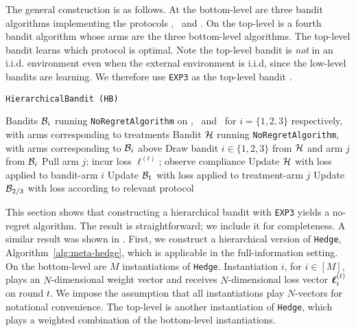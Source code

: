 The general construction is as follows. At the bottom-level are three bandit algorithms implementing the protocols \chosen, \actual\, and \comply. On the top-level is a fourth bandit algorithm whose arms are the three bottom-level algorithms. The top-level bandit learns which protocol is optimal. 
Note the top-level bandit is \emph{not} in an i.i.d. environment even when the external environment is i.i.d, since the low-level bandits are learning. We therefore use \texttt{EXP3} as the top-level bandit \cite{auer:02b}. 



\begin{algorithm}
   \caption{\texttt{HierarchicalBandit (HB)}}
   \label{alg:hier-exp}
   \begin{algorithmic}   
   	 Bandits ${\mathcal B}_i$ running \texttt{NoRegretAlgorithm} on \chosen, \actual\, and \comply\, for $i =\{1,2,3\}$ respectively, with arms corresponding to treatments
   	 Bandit ${\mathcal H}$ running \texttt{NoRegretAlgorithm}, with arms corresponding to ${\mathcal B}_i$ above
	\STATE Draw bandit $i\in\{1,2,3\}$ from ${\mathcal H}$ and arm $j$ from ${\mathcal B}_i$
	\STATE Pull arm $j$; incur loss $\ell^{(t)}$; observe compliance
	\STATE Update ${\mathcal H}$ with loss applied to bandit-arm $i$
	\STATE Update ${\mathcal B}_1$ with loss applied to treatment-arm $j$
	\ENDIF
	\STATE Update ${\mathcal B}_{2/3}$ with loss according to relevant protocol
   	\ENDFOR

       	\end{algorithmic}
\end{algorithm}          



This section shows that constructing a hierarchical bandit with \texttt{EXP3} yields a no-regret algorithm. The result is straightforward; we include it for completeness. A similar result was shown in \cite{chang:05}. 
First, we construct a hierarchical version of \texttt{Hedge}, Algorithm~\ref{alg:meta-hedge}, which is applicable in the full-information setting. On the bottom-level are $M$ instantiations of \texttt{Hedge}. Instantiation $i$, for $i\in[M]$, plays an $N$-dimensional weight vector and receives $N$-dimensional loss vector $\boldsymbol\ell^{(t)}_{i}$ on round $t$. We impose the assumption that all instantiations play $N$-vectors for notational convenience. The top-level is another instantiation of \texttt{Hedge}, which plays a weighted combination of the bottom-level instantiations.

